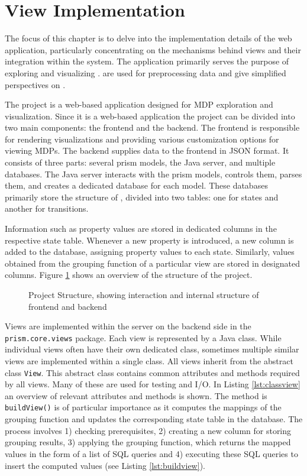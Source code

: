\documentclass[preview]{standalone}
\begin{document}
\section{View Implementation} \label{ch:viewimpl}

The focus of this chapter is to delve into the implementation details of the \emph{\pmcvis} web application, particularly concentrating on the mechanisms behind views and their integration within the system. The application primarily serves the purpose of exploring and visualizing \mdpsN. \viewsNC are used for preprocessing data and give simplified perspectives on \mdpsN.


The \pmcvis project is a web-based application designed for MDP exploration and visualization. Since it is a web-based application the project can be divided into two main components: the frontend and the backend. The frontend is responsible for rendering visualizations and providing various customization options for viewing MDPs. The backend supplies data to the frontend in JSON format. It consists of three parts: several prism models, the Java server, and multiple databases. The Java server interacts with the prism models, controls them, parses them, and creates a dedicated database for each model. These databases primarily store the structure of \mdpsN, divided into two tables: one for states and another for transitions.

Information such as property values are stored in dedicated columns in the respective state table. Whenever a new property is introduced, a new column is added to the database, assigning property values to each state. Similarly, values obtained from the grouping function of a particular view are stored in designated columns. Figure \ref{fig:projectstructure} shows an overview of the structure of the project.

\begin{figure}[h]
	
	\caption{Project Structure, showing interaction and internal structure of frontend and backend}
	\label{fig:projectstructure}
\end{figure}

Views are implemented within the server on the backend side in the 
\texttt{prism.core}\texttt{.views} package.
Each view is represented by a Java class. While individual views often have their own dedicated class, sometimes multiple similar views are implemented within a single class. All views inherit from the abstract class \texttt{View}. This abstract class contains common attributes and methods required by all views. Many of these are used for testing and I/O. In Listing \ref{lst:classview} an overview of relevant attributes and methods is shown. The method is \texttt{buildView()} is of particular importance as it computes the mappings of the grouping function and updates the corresponding state table in the database. The process involves 1) checking prerequisites, 2) creating a new column for storing grouping results, 3) applying the grouping function, which returns the mapped values in the form of a list of SQL queries and 4) executing these SQL queries to insert the computed values (see Listing \ref{lst:buildview}).
\end{document}

